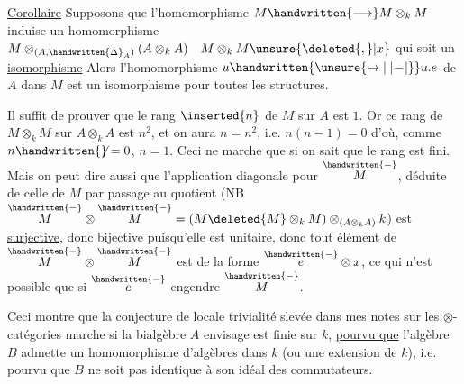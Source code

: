 
\uline{Corollaire} Supposons que l'homomorphisme $M\handwritten{\longrightarrow}M\otimes_{k}M$ induise un homomorphisme $M\otimes_{(A,\handwritten{\Delta}_{A})}(A\otimes_{k}A)\quad M\otimes_{k}M\unsure{\deleted{,}|x}$  qui soit un \uline{isomorphisme} Alors l'homomorphisme $u\handwritten{\unsure{\mapsto|\mathrel{\vert\! -\!\vert}}}u.e$ de $A$ dans $M$ est un isomorphisme pour toutes les structures.

Il suffit de prouver que le rang $\inserted{n}$ de $M$ sur $A$ est $1$. Or ce rang de $M\otimes_{k}M$ sur $A\otimes_{k}A$ est $n^{2}$, et on aura $n=n^{2}$, i.e. $n(n-1)=0$ d'où, comme $n\handwritten{\not}=0$, $n=1$. Ceci ne marche que si on sait que le rang est fini. Mais on peut dire aussi que l'application diagonale pour $\overset{\handwritten{-}}{M}$, déduite de celle de $M$ par passage au quotient (NB $\overset{\handwritten{-}}{M}\otimes\overset{\handwritten{-}}{M}=(M\deleted{M}\otimes_{k}M)\otimes_{(A\otimes_{k}A)}k$) est \uline{surjective}, donc bijective puisqu'elle est unitaire, donc tout élément de $\overset{\handwritten{-}}{M}\otimes\overset{\handwritten{-}}{M}$ est de la forme $\overset{\handwritten{-}}{e}\otimes x$, ce qui n'est possible que si $\overset{\handwritten{-}}{e}$ engendre $\overset{\handwritten{-}}{M}$.

Ceci montre que la conjecture de locale trivialité slevée dans mes notes sur les $\otimes$-catégories marche si la bialgèbre $A$ envisage est finie sur $k$, \uline{pourvu que} l'algèbre $B$ admette un homomorphisme d'algèbres dans $k$ (ou une extension de $k$), i.e. pourvu que $B$ ne soit pas identique à son idéal des commutateurs.
